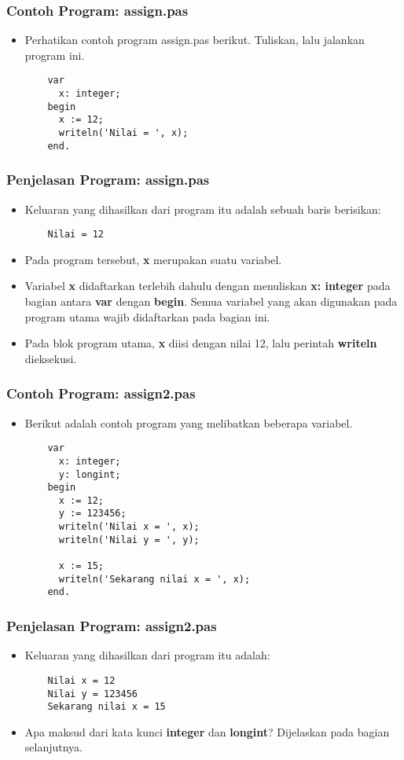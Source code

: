 \begin{frame}[fragile]
\frametitle{Contoh Program: assign.pas}
\begin{itemize}
  \item Perhatikan contoh program assign.pas berikut. Tuliskan, lalu jalankan program ini.
  \begin{lstlisting}
    var
      x: integer;
    begin
      x := 12;
      writeln('Nilai = ', x);
    end.
  \end{lstlisting}
\end{itemize}
\end{frame}

\begin{frame}[fragile]
\frametitle{Penjelasan Program: assign.pas}
\begin{itemize}
  \item Keluaran yang dihasilkan dari program itu adalah sebuah baris berisikan:
  \begin{lstlisting}
    Nilai = 12
  \end{lstlisting}
  \item Pada program tersebut, \textbf{x} merupakan suatu variabel.
  \item Variabel \textbf{x} didaftarkan terlebih dahulu dengan menuliskan \textbf{x: integer} pada bagian antara \textbf{var} dengan \textbf{begin}. Semua variabel yang akan digunakan pada program utama wajib didaftarkan pada bagian ini.
  \item Pada blok program utama, \textbf{x} diisi dengan nilai 12, lalu perintah \textbf{writeln} dieksekusi.
\end{itemize}
\end{frame}

\begin{frame}[fragile]
\frametitle{Contoh Program: assign2.pas}
\begin{itemize}
  \item Berikut adalah contoh program yang melibatkan beberapa variabel.
  \begin{lstlisting}
    var
      x: integer;
      y: longint;
    begin
      x := 12;
      y := 123456;
      writeln('Nilai x = ', x);
      writeln('Nilai y = ', y);

      x := 15;
      writeln('Sekarang nilai x = ', x);
    end.
  \end{lstlisting}
\end{itemize}
\end{frame}

\begin{frame}[fragile]
\frametitle{Penjelasan Program: assign2.pas}
\begin{itemize}
  \item Keluaran yang dihasilkan dari program itu adalah:
  \begin{lstlisting}
    Nilai x = 12
    Nilai y = 123456
    Sekarang nilai x = 15
  \end{lstlisting}
  \item Apa maksud dari kata kunci \textbf{integer} dan \textbf{longint}? Dijelaskan pada bagian selanjutnya.
\end{itemize}
\end{frame}

